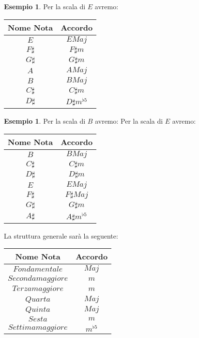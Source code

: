 \documentclass[12pt,a4paper]{report}
\theoremstyle{definition}
\theoremstyle{Theorem}
\theoremstyle{definition}
\newtheorem{Ex}[Def]{Esempio}
\theoremstyle{definition}
\theoremstyle{definition}
\begin{document}
	 		\begin{Ex}
	 			Per la scala di $E$ avremo:
	 				\begin{center}
	 				\begin{tabular}{||c|c||}
	 					\hline
	 					Nome Nota & Accordo\\
	 					\hline
	 					$E$ & $EMaj$\\
	 					\hline
	 					$F\sharp$ & $F\sharp m$\\
	 					\hline
	 					$G\sharp$ & $G\sharp m$\\
	 					\hline
	 					$A$ & $AMaj$\\
	 					\hline
	 					$B$ & $BMaj$\\
	 					\hline
	 					$C\sharp$ & $C\sharp m$\\
	 					\hline
	 					$D\sharp$ & $D\sharp m^{\flat5}$\\
	 					\hline
	 				\end{tabular}
	 			\end{center}
	 		\end{Ex}
	 		\begin{Ex}
	 			Per la scala di $B$ avremo:
	 				Per la scala di $E$ avremo:
	 			\begin{center}
	 				\begin{tabular}{||c|c||}
	 					\hline
	 					Nome Nota & Accordo\\
	 					\hline
	 					$B$ & $BMaj$\\
	 					\hline
	 					$C\sharp$ & $C\sharp m$\\
	 					\hline
	 					$D\sharp$ & $D\sharp m$\\
	 					\hline
	 					$E$ & $EMaj$\\
	 					\hline
	 					$F\sharp$ & $F\sharp Maj$\\
	 					\hline
	 					$G\sharp$ & $G\sharp m$\\
	 					\hline
	 					$A\sharp$ & $A\sharp m^{\flat5}$\\
	 					\hline
	 				\end{tabular}
	 			\end{center}
	 		\end{Ex}
	 		La struttura generale sarà la seguente:
	 		\begin{center}
	 			\begin{tabular}{||c|c||}
	 				\hline
	 				Nome Nota & Accordo\\
	 				\hline
	 				$Fondamentale$ & $Maj$\\
	 				\hline
	 				$Seconda maggiore$ & $m$\\
	 				\hline
	 				$Terza maggiore$ & $m$\\
	 				\hline
	 				$Quarta$ & $Maj$\\
	 				\hline
	 				$Quinta$ & $Maj$\\
	 				\hline
	 				$Sesta$ & $m$\\
	 				\hline
	 				$Settima maggiore$ & $m^{\flat5}$\\
	 				\hline
	 			\end{tabular}
	 		\end{center}
\end{document}
